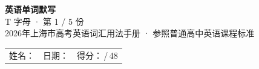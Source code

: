 \documentclass[10pt,a4paper]{article}
\begin{document}
\pagestyle{plain}

\begin{center}
{\LARGE\bfseries 英语单词默写}\\[0.22em]
{\large T 字母 · 第 1 / 5 份}\\[0.18em]
{\small 2026年上海市高考英语词汇用法手册 · 参照普通高中英语课程标准}
\end{center}

\vspace{0.25em}
\noindent\begin{tabular}{@{}p{}@{}p{}@{}p{}@{}}
姓名：\underline{\hspace{2.0cm}} & 日期：\underline{\hspace{2.0cm}} & 得分：\underline{\hspace{1.3cm}}\,/\,48 \\
\end{tabular}

\vspace{0.3em}

\vspace{0.08em}
\end{document}
